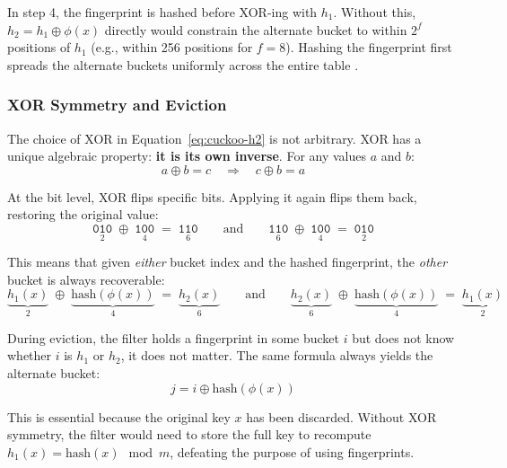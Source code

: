 \begin{insightbox}
In step 4, the fingerprint is hashed before XOR-ing with $h_1$. Without 
this, $h_2 = h_1 \oplus \phi(x)$ directly would constrain the alternate 
bucket to within $2^f$ positions of $h_1$ (e.g., within 256 positions for 
$f = 8$). Hashing the fingerprint first spreads the alternate buckets 
uniformly across the entire table \cite{cuckoo}.
\end{insightbox}

\subsubsection{XOR Symmetry and Eviction}

The choice of XOR in Equation~\ref{eq:cuckoo-h2} is not arbitrary. XOR 
has a unique algebraic property: \textbf{it is its own inverse}. For any 
values $a$ and $b$:
\begin{equation}
  a \oplus b = c \quad \Longrightarrow \quad c \oplus b = a
  \label{eq:xor-inverse}
\end{equation}

At the bit level, XOR flips specific bits. Applying it again flips them 
back, restoring the original value:
\[
  \underset{2}{\texttt{010}} \;\oplus\; \underset{4}{\texttt{100}} 
  \;=\; \underset{6}{\texttt{110}}
  \qquad \text{and} \qquad
  \underset{6}{\texttt{110}} \;\oplus\; \underset{4}{\texttt{100}} 
  \;=\; \underset{2}{\texttt{010}}
\]

This means that given \emph{either} bucket index and the hashed 
fingerprint, the \emph{other} bucket is always recoverable:
\[
  \underbrace{h_1(x)}_{2} \;\oplus\; 
  \underbrace{\text{hash}(\phi(x))}_{4} \;=\; 
  \underbrace{h_2(x)}_{6}
  \qquad \text{and} \qquad
  \underbrace{h_2(x)}_{6} \;\oplus\; 
  \underbrace{\text{hash}(\phi(x))}_{4} \;=\; 
  \underbrace{h_1(x)}_{2}
\]

During eviction, the filter holds a fingerprint in some bucket $i$ but 
does not know whether $i$ is $h_1$ or $h_2$, it does not matter. The 
same formula always yields the alternate bucket:
\begin{equation}
  j = i \oplus \text{hash}(\phi(x))
  \label{eq:cuckoo-alternate}
\end{equation}

This is essential because the original key $x$ has been discarded. 
Without XOR symmetry, the filter would need to store the full key to 
recompute $h_1(x) = \text{hash}(x) \mod m$, defeating the purpose of 
using fingerprints.

